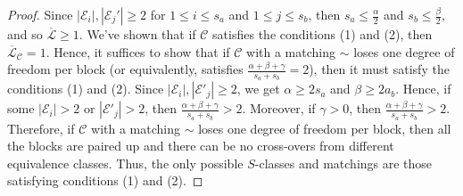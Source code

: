 \documentclass[11pt,reqno]{amsart}
\numberwithin{equation}{section}
\theoremstyle{plain}
\newtheorem{definition}[thm]{Definition}
\begin{document}
\begin{proof}
Since $|\mathcal{E}_{i}|,|\mathcal{E}_{j}'|\geq 2$ for $1\leq i\leq s_a$ and $1\leq j\leq s_b$, then $s_a\leq \frac{\alpha}{2}$ and $s_b\leq \frac{\beta}{2}$, and so $\mathcal{\overline{L}}\geq 1$. We've shown that if $\mathcal{C}$ satisfies the conditions (1) and (2), then $\mathcal{\overline{L}}_\mathcal{C}=1$. Hence, it suffices to show that if $\mathcal{C}$ with a matching $\sim$ loses one degree of freedom per block (or equivalently, satisfies $\frac{\alpha+\beta+\gamma}{s_a+s_b}=2$), then it must satisfy the conditions (1) and (2). Since $|\mathcal{E}_{i}|,|\mathcal{E}'_{j}|\geq 2$, we get $\alpha\geq 2s_a$ and $\beta\geq 2a_b$. Hence, if some $|\mathcal{E}_{i}|>2$ or $|\mathcal{E}'_{j}|> 2$, then $\frac{\alpha+\beta+\gamma}{s_a+s_b}>2$. Moreover, if $\gamma>0$, then $\frac{\alpha+\beta+\gamma}{s_a+s_b}>2$. Therefore, if $\mathcal{C}$ with a matching $\sim$ loses one degree of freedom per block, then all the blocks are paired up and there can be no cross-overs from different equivalence classes. Thus, the only possible $S$-classes and matchings are those satisfying conditions (1) and (2).
\end{proof}

\end{document}
